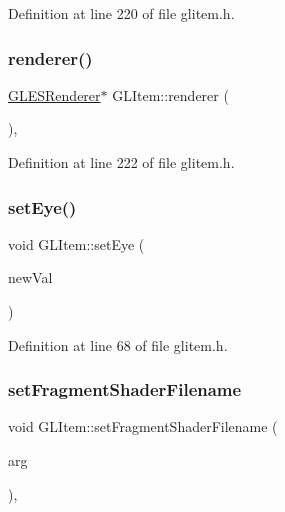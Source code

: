 Definition at line 220 of file glitem.\+h.

\mbox{\label{class_g_l_item_a4575b8c146849022b567a75b4f9cfa8e}} 
\subsubsection{\texorpdfstring{renderer()}{renderer()}}
{\footnotesize\ttfamily \mbox{\hyperlink{class_g_l_e_s_renderer}{G\+L\+E\+S\+Renderer}}$\ast$ G\+L\+Item\+::renderer (\begin{DoxyParamCaption}{ }\end{DoxyParamCaption})\hspace{0.3cm}{\ttfamily [inline]}, {\ttfamily [protected]}}



Definition at line 222 of file glitem.\+h.

\mbox{\label{class_g_l_item_a9a731cdacee49b522f6da9f7439048dd}} 
\subsubsection{\texorpdfstring{setEye()}{setEye()}}
{\footnotesize\ttfamily void G\+L\+Item\+::set\+Eye (\begin{DoxyParamCaption}\item[{const Q\+Vector3D \&}]{new\+Val }\end{DoxyParamCaption})\hspace{0.3cm}{\ttfamily [inline]}}



Definition at line 68 of file glitem.\+h.

\mbox{\label{class_g_l_item_ad20ccfff6747a45ecd150f870fa832bf}} 
\subsubsection{\texorpdfstring{setFragmentShaderFilename}{setFragmentShaderFilename}}
{\footnotesize\ttfamily void G\+L\+Item\+::set\+Fragment\+Shader\+Filename (\begin{DoxyParamCaption}\item[{Q\+String}]{arg }\end{DoxyParamCaption})\hspace{0.3cm}{\ttfamily [inline]}, {\ttfamily [slot]}}




